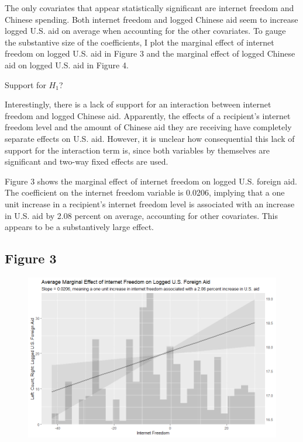 \documentclass[12pt]{article}
\begin{document}
The only covariates that appear statistically significant are internet freedom and Chinese spending. Both internet freedom and logged Chinese aid seem to increase logged U.S. aid on average when accounting for the other covariates. To gauge the substantive size of the coefficients, I plot the marginal effect of internet freedom on logged U.S. aid in Figure 3 and the marginal effect of logged Chinese aid on logged U.S. aid in Figure 4.

Support for $H_1$?

Interestingly, there is a lack of support for an interaction between internet freedom and logged Chinese aid. Apparently, the effects of a recipient's internet freedom level and the amount of Chinese aid they are receiving have completely separate effects on U.S. aid. However, it is unclear how consequential this lack of support for the interaction term is, since both variables by themselves are significant and two-way fixed effects are used.

\pagebreak
Figure 3 shows the marginal effect of internet freedom on logged U.S. foreign aid. The coefficient on the internet freedom variable is 0.0206, implying that a one unit increase in a recipient's internet freedom level is associated with an increase in U.S. aid by 2.08 percent on average, accounting for other covariates. This appears to be a substantively large effect.

\subsection*{Figure 3}
\begin{figure}[htbp]
    \includegraphics[scale=0.7]{Figures/628plot1.png}
\end{figure}
\end{document}
